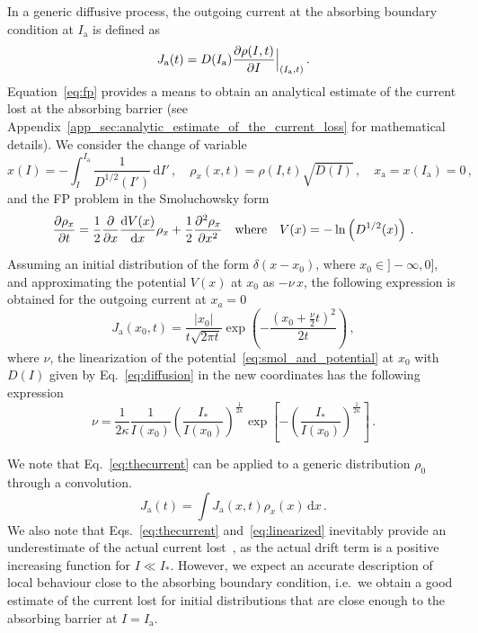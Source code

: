 In a generic diffusive process, the outgoing current at the absorbing boundary condition at $I_\mathrm{a}$ is defined as
\begin{equation}
    J_\mathrm{a}(t) = D(I_\mathrm{a})\pdv{\rho(I, t)}{I} \Bigr|_{(I_\mathrm{a}, t)}\,.
    \label{eq:outgoing_current_definition}
\end{equation}
Equation~\eqref{eq:fp} provides a means to obtain an analytical estimate of the current lost at the absorbing barrier (see Appendix~\ref{app_sec:analytic_estimate_of_the_current_loss} for mathematical details). We consider the change of variable
\begin{equation}
    x(I) = -\int_I^{I_\mathrm{a}} \frac{1}{D^{1/2}(I')}\,\mathrm{d}I' \,, \quad \rho_x(x,t) = \rho(I, t) \sqrt{D(I)} \,, \quad x_\mathrm{a}=x(I_\mathrm{a})=0 \, ,
    \label{eq:change_of_variable}
\end{equation}
and the FP problem in the Smoluchowsky form
\begin{equation}
    \pdv{\rho_x}{t} = \frac{1}{2}\pdv{x} \dv{V(x)}{x} \rho_x+\frac{1}{2}\pdv[2]{\rho_x}{x} \quad \text{where} \quad V(x) = -\ln\left(D^{1/2}(x)\right) \, .
    \label{eq:smol_and_potential}
\end{equation}

Assuming an initial distribution of the form $\delta(x - x_0)$, where $x_0 \in ] -\infty, 0]$, and approximating the potential $V(x)$ at $x_0$ as $-\nu \, x$, the following expression is obtained for the outgoing current at $x_a = 0$
\begin{equation}
    J_\mathrm{a}(x_0, t) = \frac{|x_0|}{t\sqrt{2\pi t}}\exp\left(-\frac{(x_0+\frac{\nu}{2}t)^2}{2t}\right) \,,
    \label{eq:thecurrent}
\end{equation}
where $\nu$, the linearization of the potential~\eqref{eq:smol_and_potential} at $x_0$ with $D(I)$ given by Eq.~\eqref{eq:diffusion} in the new coordinates has the following expression
\begin{equation}
    \nu=\frac{1}{2\kappa}\frac{1}{I(x_0)}\left(\frac{I_\ast}{I(x_0)}\right)^{\frac{1}{2\kappa}}\exp\left[-\left(\frac{I_\ast}{I(x_0)}\right)^{\frac{1}{2\kappa}}\right]\,.
    \label{eq:linearized}
\end{equation}

We note that Eq.~\eqref{eq:thecurrent} can be applied to a generic distribution $\rho_0$ through a convolution.
\begin{equation}
    J_\mathrm{a}(t) = \int J_\mathrm{a}(x,t)\rho_x(x)\,\mathrm{d}x\,.
    \label{eq:current_convolution}
\end{equation}
We also note that Eqs.~\eqref{eq:thecurrent} and~\eqref{eq:linearized} inevitably provide an underestimate of the actual current lost~\cite{montanari:ipac2021:tupab233}, as the actual drift term is a positive increasing function for $I\ll I_\ast$. However, we expect an accurate description of local behaviour close to the absorbing boundary condition, i.e.\ we obtain a good estimate of the current lost for initial distributions that are close enough to the absorbing barrier at $I=I_\mathrm{a}$. 


